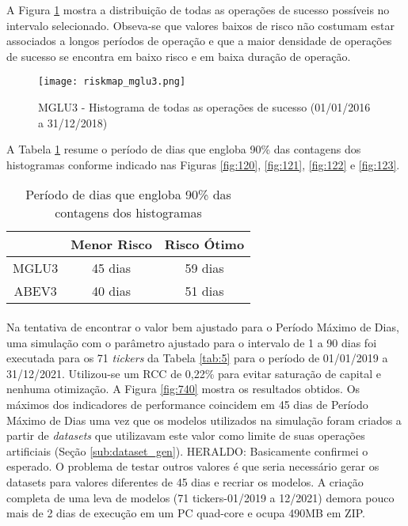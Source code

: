 A Figura \ref{fig:540} mostra a distribuição de todas as operações de sucesso possíveis no intervalo selecionado. Obseva-se que valores baixos de risco não costumam estar associados a longos períodos de operação e que a maior densidade de operações de sucesso se encontra em baixo risco e em baixa duração de operação.

\begin{figure}[!htb]
    \texttt{[image: riskmap\_mglu3.png]}
    \centering
    \caption{MGLU3 - Histograma de todas as operações de sucesso (01/01/2016 a 31/12/2018)}
    \label{fig:540}
\end{figure}

A Tabela \ref{tab:4} resume o período de dias que engloba 90\% das contagens dos histogramas conforme indicado nas Figuras \ref{fig:120}, \ref{fig:121}, \ref{fig:122} e \ref{fig:123}.

\begin{table}[h!]
    \begin{center}
        \begin{tabular}{ c|cc }
            & Menor Risco & Risco Ótimo \\
            \hline
            MGLU3 & 45 dias & 59 dias \\
            ABEV3 & 40 dias & 51 dias \\
        \end{tabular}
        \caption{Período de dias que engloba 90\% das contagens dos histogramas}
        \label{tab:4}
    \end{center}
\end{table}

\paragraph{} Na tentativa de encontrar o valor bem ajustado para o Período Máximo de Dias, uma simulação com o parâmetro ajustado para o intervalo de 1 a 90 dias foi executada para os 71 \textit{tickers} da Tabela \ref{tab:5} para o período de 01/01/2019 a 31/12/2021. Utilizou-se um RCC de 0,22\% para evitar saturação de capital e nenhuma otimização. A Figura \ref{fig:740} mostra os resultados obtidos. Os máximos dos indicadores de performance coincidem em 45 dias de Período Máximo de Dias uma vez que os modelos utilizados na simulação foram criados a partir de \textit{datasets} que utilizavam este valor como limite de suas operações artificiais (Seção \ref{sub:dataset_gen}). \color{red} HERALDO: Basicamente confirmei o esperado. O problema de testar outros valores é que seria necessário gerar os datasets para valores diferentes de 45 dias e recriar os modelos. A criação completa de uma leva de modelos (71 tickers-01/2019 a 12/2021) demora pouco mais de 2 dias de execução em um PC quad-core e ocupa 490MB em ZIP. \color{black}

